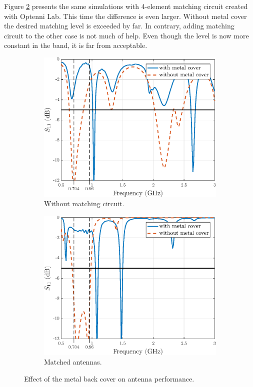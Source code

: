 Figure \ref{fig:metal_vs_nometal_matched} presents the same simulations with 4-element matching circuit created with Optenni Lab. This time the difference is even larger. Without metal cover the desired matching level is exceeded by far. In contrary, adding matching circuit to the other case is not much of help. Even though the level is now more constant in the band, it is far from acceptable.

\begin{figure}[H]
    \centering 
    \begin{subfigure}[b]{0.49\textwidth}
        \includegraphics[width=\textwidth]{img/metal_vs_nometal.eps}
        \caption{Without matching circuit.}
        \label{fig:metal_vs_nometal}
    \end{subfigure}
    \begin{subfigure}[b]{0.49\textwidth}
        \includegraphics[width=\textwidth]{img/metal_vs_nometal_matched.eps}
        \caption{Matched antennas.}
        \label{fig:metal_vs_nometal_matched}
    \end{subfigure}
    \caption{Effect of the metal back cover on antenna performance.}
    \label{fig:metal_vs_nometal_results}
\end{figure}



